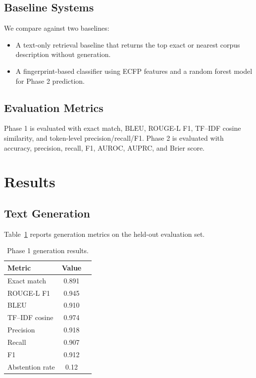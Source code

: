 \documentclass[conference]{IEEEtran}
\begin{document}
\subsection{Baseline Systems}
We compare against two baselines:
\begin{itemize}
    \item A text-only retrieval baseline that returns the top exact or nearest corpus description without generation.
    \item A fingerprint-based classifier using ECFP features and a random forest model for Phase 2 prediction.
\end{itemize}

\subsection{Evaluation Metrics}
Phase 1 is evaluated with exact match, BLEU, ROUGE-L F1, TF--IDF cosine similarity, and token-level precision/recall/F1. Phase 2 is evaluated with accuracy, precision, recall, F1, AUROC, AUPRC, and Brier score.

\section{Results}
\subsection{Text Generation}
Table~\ref{tab:gen_results} reports generation metrics on the held-out evaluation set.

\begin{table}[t]
    \centering
    \caption{Phase 1 generation results.}
    \label{tab:gen_results}
    \begin{tabular}{@{}lcc@{}}
    \toprule
    Metric & Value \\
    \midrule
    Exact match & 0.891 \\
    ROUGE-L F1 & 0.945 \\
    BLEU & 0.910 \\
    TF--IDF cosine & 0.974 \\
    Precision & 0.918 \\
    Recall & 0.907 \\
    F1 & 0.912 \\
    Abstention rate & 0.12 \\
    \bottomrule
    \end{tabular}
\end{table}
\end{document}

